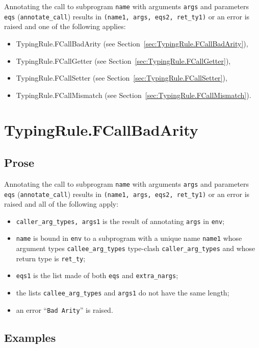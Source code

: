 \documentclass{book}
\begin{document}
Annotating the call to subprogram \texttt{name} with arguments \texttt{args} and
parameters \texttt{eqs} (\texttt{annotate\_call}) results in \texttt{(name1,
args, eqs2, ret\_ty1)} or an error is raised and one of the following applies:
\begin{itemize}
\item TypingRule.FCallBadArity (see Section~\ref{sec:TypingRule.FCallBadArity}),
\item TypingRule.FCallGetter (see Section~\ref{sec:TypingRule.FCallGetter}),
\item TypingRule.FCallSetter (see Section~\ref{sec:TypingRule.FCallSetter}),
\item TypingRule.FCallMismatch (see Section~\ref{sec:TypingRule.FCallMismatch}).
\end{itemize}

\section{TypingRule.FCallBadArity \label{sec:TypingRule.FCallBadArity}}

  \subsection{Prose} 
  Annotating the call to subprogram \texttt{name} with arguments \texttt{args}
and parameters \texttt{eqs} (\texttt{annotate\_call}) results in
\texttt{(name1, args, eqs2, ret\_ty1)} or an error is raised and all of the
following apply:
   \begin{itemize}
   \item \texttt{caller\_arg\_types, args1} is the result of annotating \texttt{args} in \texttt{env};
   \item \texttt{name} is bound in \texttt{env} to a subprogram with a unique name \texttt{name1}
      whose argument types \texttt{callee\_arg\_types} type-clash
      \texttt{caller\_arg\_types} and whose return type is \texttt{ret\_ty};
   \item \texttt{eqs1} is the list made of both \texttt{eqs} and \texttt{extra\_nargs};
   \item the lists \texttt{callee\_arg\_types} and \texttt{args1} do not have the same length;
   \item an error ``\texttt{Bad Arity}'' is raised.
   \end{itemize}

  \subsection{Examples}
\end{document}
